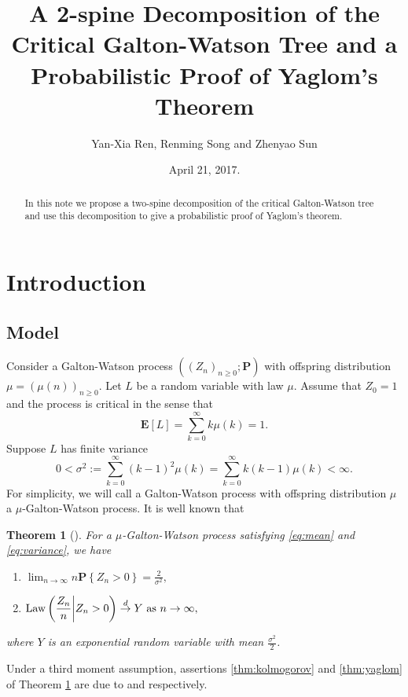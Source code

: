 \documentclass[12pt]{amsart}
\title[A 2-spine decomposition and Yaglom's theorem]
{\large A 2-spine Decomposition of the Critical Galton-Watson Tree and a Probabilistic Proof of Yaglom's Theorem}
\author{Yan-Xia Ren, Renming Song and Zhenyao Sun}
\date{April 21, 2017.}
\newtheorem{thm}{Theorem}[section]
\numberwithin{equation}{section}
\newcommand{\expr}[1]{\left( #1 \right)}
\newcommand{\set}[1]{\left\{ #1 \right\}}
\newcommand{\law}{\text{\rm Law}}
\newcommand{\tolaw}{\stackrel{d}{\to}}
\newcommand{\expct}{\mathbf E}
\newcommand{\bP}{\mathbf P}\newcommand{\bbP}{\mathbb P}\newcommand{\cP}{\mathcal P}
\begin{document}
\begin{abstract}
	In this note  we propose a two-spine decomposition of the critical Galton-Watson tree and use this decomposition to give a probabilistic proof of Yaglom's theorem.
\end{abstract}
\maketitle	
\section{Introduction}
\subsection{Model}
\label{sec:model}
	Consider a Galton-Watson process $((Z_n)_{n\ge0}; \bP )$ with offspring distribution $\mu=(\mu(n))_{n\ge 0}$.
	Let $L$ be a random variable with law $\mu$. Assume that $Z_0=1$ and the process is critical in the sense that
\begin{equation}
\label{eq:mean}
		\expct [L]
	=
		\sum_{k=0}^\infty k \mu(k)
	=
		1.
\end{equation}
	Suppose $L$ has finite variance
\begin{equation}
\label{eq:variance}
		0	
	<	
		\sigma^2
	:=
		\sum_{k=0}^\infty  (k-1)^2 \mu(k)
	=
		\sum_{k=0}^\infty k(k-1) \mu(k)
	<
		\infty.
\end{equation}
	For simplicity, we will call a Galton-Watson process with offspring distribution $\mu$ a $\mu$-Galton-Watson process. 
	It is well known that
\begin{thm}[\cite{kesten1966galton}]
\label{thm:kesten}
	For a $\mu$-Galton-Watson process satisfying \eqref{eq:mean} and \eqref{eq:variance}, we have
\begin{enumerate}
\item
\label{thm:kolmogorov}
	$\displaystyle \lim_{n \to \infty} n \bP \set{Z_n>0} = \frac{2}{\sigma^2},$ 
\item
\label{thm:yaglom}
	$\displaystyle	\law\expr{\frac{Z_n}{n}\bigg| Z_n>0}\tolaw Y \ \text{as }n\to\infty,$
\end{enumerate}
	where $Y$ is an exponential random variable with mean $\frac{\sigma^2}{2}$.
\end{thm}
\par
	Under a third moment assumption, assertions \eqref{thm:kolmogorov} and \eqref{thm:yaglom} of Theorem \ref{thm:kesten} are due to \cite{kolmogorov1938losung} and \cite{yaglom1947certain} respectively. 
\end{document}
